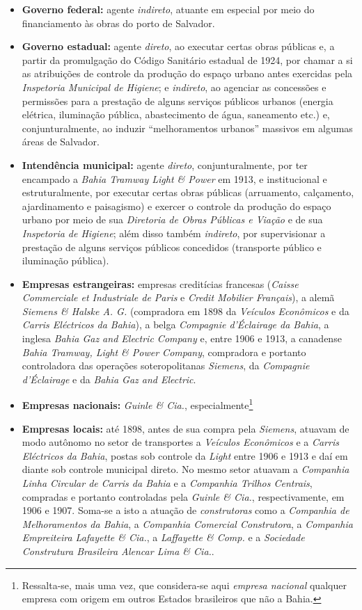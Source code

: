 \begin{itemize}
\item \textbf{Governo federal:} agente \textit{indireto}, atuante em especial por meio do financiamento às obras do porto de Salvador.
\item \textbf{Governo estadual:} agente \textit{direto}, ao executar certas obras públicas e, a partir da promulgação do Código Sanitário estadual de 1924, por chamar a si as atribuições de controle da produção do espaço urbano antes exercidas pela \textit{Inspetoria Municipal de Higiene}; e \textit{indireto}, ao agenciar as concessões e permissões para a prestação de alguns serviços públicos urbanos (energia elétrica, iluminação pública, abastecimento de água, saneamento etc.) e, conjunturalmente, ao induzir ``melhoramentos urbanos'' massivos em algumas áreas de Salvador.
\item \textbf{Intendência municipal:} agente \textit{direto}, conjunturalmente, por ter encampado a \textit{Bahia Tramway Light \& Power} em 1913, e institucional e estruturalmente, por executar certas obras públicas (arruamento, calçamento, ajardinamento e paisagismo) e exercer o controle da produção do espaço urbano por meio de sua \textit{Diretoria de Obras Públicas e Viação} e de sua \textit{Inspetoria de Higiene}; além disso também \textit{indireto}, por supervisionar a prestação de alguns serviços públicos concedidos (transporte público e iluminação pública). 
\item \textbf{Empresas estrangeiras:} empresas creditícias francesas (\textit{Caisse Commerciale et Industriale de Paris} e \textit{Credit Mobilier Français}), a alemã \textit{Siemens \& Halske A. G.} (compradora em 1898 da \textit{Veículos Econômicos} e da \textit{Carris Eléctricos da Bahia}), a belga \textit{Compagnie d'Éclairage da Bahia}, a inglesa \textit{Bahia Gaz and Electric Company} e, entre 1906 e 1913, a canadense \textit{Bahia Tramway, Light \& Power Company}, compradora e portanto controladora das operações soteropolitanas \textit{Siemens}, da \textit{Compagnie d'Éclairage} e da \textit{Bahia Gaz and Electric}.
\item \textbf{Empresas nacionais:} \textit{Guinle \& Cia.}, especialmente\footnote{Ressalta-se, mais uma vez, que considera-se aqui \textit{empresa nacional} qualquer empresa com origem em outros Estados brasileiros que não a Bahia.}
\item \textbf{Empresas locais:} até 1898, antes de sua compra pela \textit{Siemens}, atuavam de modo autônomo no setor de transportes a \textit{Veículos Econômicos} e a \textit{Carris Eléctricos da Bahia}, postas sob controle da \textit{Light} entre 1906 e 1913 e daí em diante sob controle municipal direto. No mesmo setor atuavam a \textit{Companhia Linha Circular de Carris da Bahia} e a \textit{Companhia Trilhos Centrais}, compradas e portanto controladas pela \textit{Guinle \& Cia.}, respectivamente, em 1906 e 1907. Soma-se a isto a atuação de \textit{construtoras} como a \textit{Companhia de Melhoramentos da Bahia}, a \textit{Companhia Comercial Construtora}, a \textit{Companhia Empreiteira Lafayette \& Cia.}, a \textit{Laffayette \& Comp.} e a \textit{Sociedade Construtura Brasileira Alencar Lima \& Cia.}.

\end{itemize}
